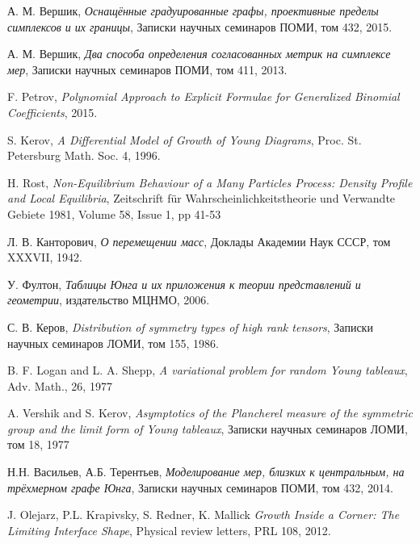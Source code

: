 \documentclass[12pt]{report}
\begin{document}
\newpage
\begin{thebibliography}{99}

  А. М. Вершик,
  \emph{Оснащённые градуированные графы, проективные пределы симплексов и их границы},
  Записки научных семинаров ПОМИ,
  том 432,
  2015.
  
  А. М. Вершик,
    \emph{Два способа определения согласованных метрик на симплексе мер},
    Записки научных семинаров ПОМИ,
    том 411,
    2013.
  
  F. Petrov,
  \emph{Polynomial Approach to Explicit Formulae for
  Generalized Binomial Coefficients},
  2015.
  
    S. Kerov,
    \emph{A Differential Model of Growth of Young Diagrams}, Proc. St. Petersburg Math. Soc. 4,
    1996.
    
    H. Rost,
    \emph{Non-Equilibrium Behaviour of a Many Particles Process: Density Profile and Local Equilibria}, Zeitschrift für Wahrscheinlichkeitstheorie und Verwandte Gebiete
    1981, Volume 58, Issue 1, pp 41-53

  Л. В. Канторович,
  \emph{О перемещении масс},
  Доклады Академии Наук СССР,
  том XXXVII,
  1942.

  У. Фултон,
  \emph{Таблицы Юнга и их приложения к теории представлений и геометрии},
  издательство МЦНМО,
  2006.
  
  
  С. В. Керов, \emph{Distribution of symmetry types of high rank tensors},
  Записки научных семинаров ЛОМИ, том 155, 1986.

  B. F. Logan and L. A. Shepp, \emph{A variational problem for random Young tableaux}, Adv. Math.,
  26, 1977

  A. Vershik and S. Kerov, \emph{Asymptotics of the Plancherel measure of the symmetric group and
  the limit form of Young tableaux}, Записки научных семинаров ЛОМИ, том 18, 1977

  Н.Н. Васильев, А.Б. Терентьев, \emph{Моделирование мер, близких к центральным, на трёхмерном графе Юнга},
  Записки научных семинаров ПОМИ, том 432, 2014.

  J. Olejarz, P.L. Krapivsky, S. Redner, K. Mallick \emph{Growth Inside a Corner: The Limiting Interface Shape},
  Physical review letters, PRL 108, 2012.
  
\end{thebibliography}
\end{document}
